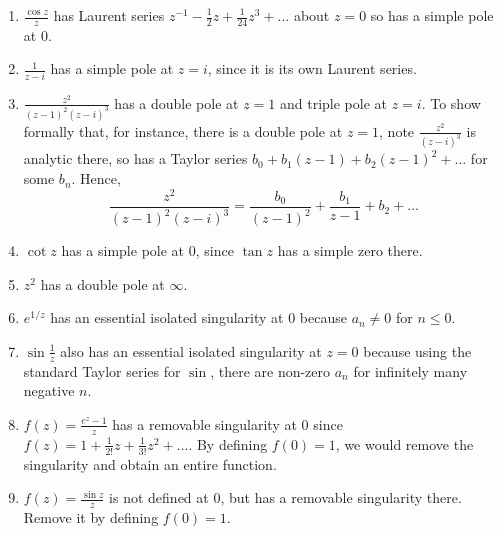 \documentclass[a4paper]{article}
\begin{document}
\begin{eg}\leavevmode
\begin{enumerate}
    \item $\frac{\cos z}{z}$ has Laurent series $z^{-1}-\frac{1}{2}z+\frac{1}{24}z^3+\dots$ about $z=0$ so has a simple pole at 0.
    \item $\frac{1}{z-i}$ has a simple pole at $z=i$, since it is its own Laurent series.
    \item $\frac{z^2}{(z-1)^2(z-i)^3}$ has a double pole at $z=1$ and triple pole at $z=i$. To show formally that, for instance, there is a double pole at $z=1$, note $\frac{z^2}{(z-i)^3}$ is analytic there, so has a Taylor series $b_0+b_1(z-1)+b_2(z-1)^2+\dots$ for some $b_n$. Hence,
    $$\frac{z^2}{(z-1)^2(z-i)^3}=\frac{b_0}{(z-1)^2}+\frac{b_1}{z-1}+b_2+\dots$$
    \item $\cot z$ has a simple pole at 0, since $\tan z$ has a simple zero there.
    \item $z^2$ has a double pole at $\infty$.
    \item $e^{1/z}$ has an essential isolated singularity at 0 because $a_n\neq 0$ for $n\leq 0$.
    \item $\sin\frac{1}{z}$ also has an essential isolated singularity at $z=0$ because using the standard Taylor series for $\sin$, there are non-zero $a_n$ for infinitely many negative $n$.
    \item $f(z)=\frac{e^z-1}{z}$ has a removable singularity at 0 since $f(z)=1+\frac{1}{2!}z+\frac{1}{3!}z^2+\dots$. By defining $f(0)=1$, we would remove the singularity and obtain an entire function.
    \item $f(z)=\frac{\sin z}{z}$ is not defined at 0, but has a removable singularity there. Remove it by defining $f(0)=1$.
\end{enumerate}
\end{eg}
\newpage
\end{document}
